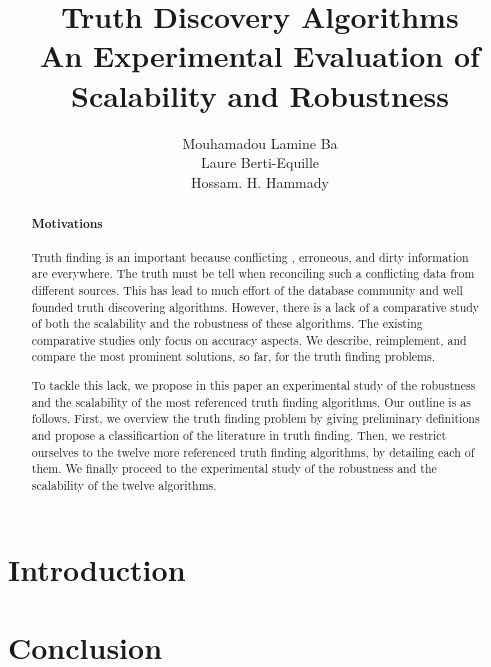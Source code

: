 \documentclass{vldb}
\begin{document}
\title{Truth Discovery Algorithms\\ An Experimental Evaluation of Scalability and Robustness}
\author{
\alignauthor
Mouhamadou Lamine Ba\\
\alignauthor
Laure Berti-Equille\\
\alignauthor 
Hossam. H. Hammady\\
}%
\maketitle
\begin{abstract}
\paragraph*{Motivations} Truth finding is an important because conflicting , erroneous, and dirty
information are everywhere. The truth must be tell when reconciling such a conflicting data from different sources. 
This has lead to much effort of the database community and well founded truth discovering algorithms. However, there 
is a lack of a comparative study of both the scalability and the robustness of these algorithms. The existing comparative 
studies only focus on accuracy aspects. We describe, reimplement, and compare the most prominent solutions, so far, 
for the truth finding problems. 

To tackle this lack, we propose in this paper an experimental study of the robustness
and the scalability of the most referenced truth finding algorithms.  Our outline is as follows.
First, we overview the truth finding problem by giving preliminary definitions and propose a classificartion of the literature
in truth finding. Then, we restrict ourselves to the twelve more referenced truth finding algorithms, by detailing each of them. 
We finally proceed to the experimental study of the robustness and the scalability of the twelve algorithms.
\end{abstract}

\section{Introduction}






\section{Conclusion}
\end{document}
